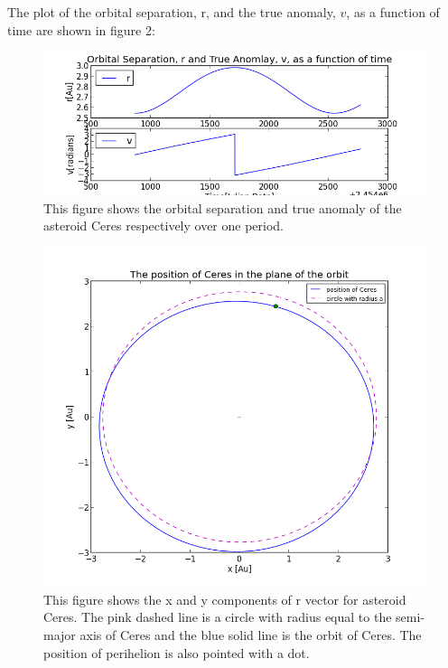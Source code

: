 \documentclass[letterpaper,12pt]{article}
\begin{document}
The plot of the orbital separation, r, and the true anomaly, \begin{math} v \end{math}, as a function of time are shown in figure 2:
\FloatBarrier
\begin{figure}[h!]
\centering
\includegraphics[scale=0.7]{figure4.png}
\caption{This figure shows the orbital separation and true anomaly of the asteroid Ceres respectively over one period.}
\end{figure}
\FloatBarrier




\FloatBarrier
\begin{figure}[h!]
\centering
\includegraphics[scale=0.5]{figure5.png}
\caption{This figure shows the x and y components of r vector for asteroid Ceres. The pink dashed line is a circle with radius equal to the semi-major axis of Ceres and the blue solid line is the orbit of Ceres. The position of perihelion is also pointed with a dot.}
\end{figure}
\FloatBarrier
\end{document}
